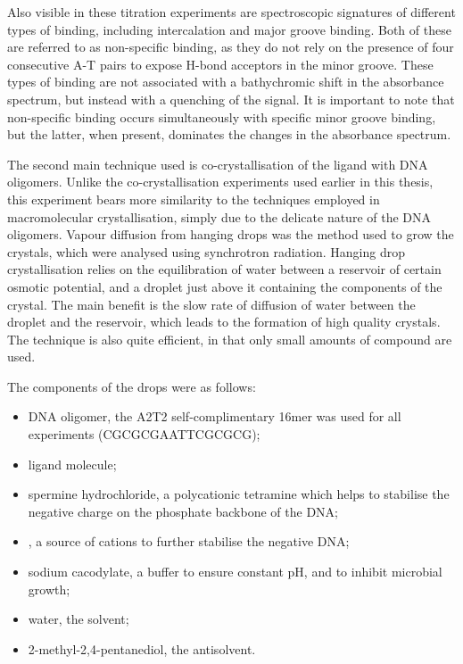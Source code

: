 \begin{refsection}
Also visible in these titration experiments are spectroscopic signatures of different types of binding, including intercalation and major groove binding.
Both of these are referred to as non-specific binding, as they do not rely on the presence of four consecutive A-T pairs to expose H-bond acceptors in the minor groove.
These types of binding are not associated with a bathychromic shift in the absorbance spectrum, but instead with a quenching of the signal.
It is important to note that non-specific binding occurs simultaneously with specific minor groove binding, but the latter, when present, dominates the changes in the absorbance spectrum.

The second main technique used is co-crystallisation of the ligand with DNA oligomers.
Unlike the co-crystallisation experiments used earlier in this thesis, this experiment bears more similarity to the techniques employed in macromolecular crystallisation, simply due to the delicate nature of the DNA oligomers.
Vapour diffusion from hanging drops was the method used to grow the crystals, which were analysed using synchrotron radiation.
Hanging drop crystallisation relies on the equilibration of water between a reservoir of certain osmotic potential, and a droplet just above it containing the components of the crystal.
The main benefit is the slow rate of diffusion of water between the droplet and the reservoir, which leads to the formation of high quality crystals.
The technique is also quite efficient, in that only small amounts of compound are used.

The components of the drops were as follows:
\begin{itemize}
    \item DNA oligomer, the A2T2 self-complimentary 16mer was used for all experiments (CGCGCGAATTCGCGCG);
    \item ligand molecule;
    \item spermine hydrochloride, a polycationic tetramine which helps to stabilise the negative charge on the phosphate backbone of the DNA;
    \item {}, a source of  cations to further stabilise the negative DNA;
    \item sodium cacodylate, a buffer to ensure constant pH, and to inhibit microbial growth;
    \item water, the solvent;
    \item 2-methyl-2,4-pentanediol, the antisolvent.
\end{itemize}


\end{refsection}
